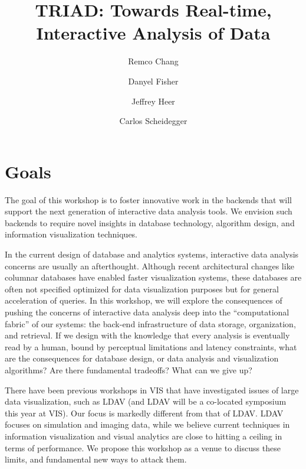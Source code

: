 \documentclass[journal]{vgtc}                %
\title{TRIAD: Towards Real-time, Interactive Analysis of Data}
\author{Remco Chang \and Danyel Fisher \and Jeffrey Heer \and Carlos Scheidegger}
\begin{document}
\maketitle
\section{Goals}
The goal of this workshop is to foster innovative work in the backends
that will support the next generation of interactive data analysis
tools. We envision such backends to require novel insights in database
technology, algorithm design, and information visualization techniques.

In the current design of database and analytics systems, interactive
data analysis concerns are usually an afterthought. Although recent
architectural changes like columnar databases have enabled faster
visualization systems, these databases are often not specified optimized for data visualization purposes but for general acceleration of queries. In
this workshop, we will explore the consequences of pushing the
concerns of interactive data analysis deep into the ``computational
fabric'' of our systems: the back-end infrastructure of data storage,
organization, and retrieval. If we design with the knowledge that
every analysis is eventually read by a human, bound by perceptual
limitations and latency constraints, what are the consequences for
database design, or data analysis and visualization algorithms? Are
there fundamental tradeoffs? What can we give up?

There have been previous workshops in VIS that have investigated
issues of large data visualization, such as LDAV (and LDAV will be a
co-located symposium this year at VIS). Our focus is markedly
different from that of LDAV. LDAV focuses on simulation and imaging
data, while we believe current techniques in information visualization
and visual analytics are close to hitting a ceiling in terms of
performance. We propose this workshop as a venue to discuss these
limits, and fundamental new ways to attack them.
\end{document}
